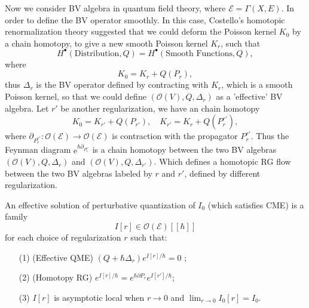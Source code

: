 \documentclass[10pt]{article}
\begin{document}
Now we consider BV algebra in quantum field theory, where $ \mathcal{E} = \Gamma(X,E)$.
In order to define the BV operator smoothly. In this case, Costello's homotopic renormalization theory suggested that we could deform the Poisson kernel $ K_0$ by a chain homotopy, to give a new smooth Poisson kernel $ K_r$, such that
\begin{equation*}
  H^{\bullet}(\text{Distribution}, Q) = H^{\bullet}(\text{Smooth Functions}, Q),
\end{equation*}
where
\begin{equation*}
  K_0 = K_r + Q(P_r),
\end{equation*}
thus $ \Delta_{r}$ is the BV operator defined by contracting with $ K_r$, which is a smooth Poisson kernel, so that we could define $\left( \mathcal{O}(V), Q, \Delta_{r} \right)$ as a 'effective' BV algebra.
Let $ r'$ be another regularization, we have an chain homotopy
\begin{equation*}
  K_0 = K_{r'} + Q(P_{r'}), \quad K_{r'} = K_{r} + Q(P_r^{r'}),
\end{equation*}
where $\partial_{P_{r}^{r'}}: \mathcal{O}(\mathcal{E}) \rightarrow \mathcal{O}(\mathcal{E})$ is contraction with the propagator $ P_{r}^{r'}$.
Thus the Feynman diagram $ \mathrm{e}^{\hbar \partial_{P_{r}^{r'}}}$ is a chain homotopy between the two BV algebras $\left( \mathcal{O}(V), Q, \Delta_{r} \right)$ and $\left( \mathcal{O}(V), Q, \Delta_{r'} \right)$.
Which defines a homotopic RG flow between the two BV algebras labeled by $ r$ and $ r'$, defined by different regularization.
\begin{definition}
  An effective solution of perturbative quantization of $I_0$ (which satisfies CME) is a family
  \begin{equation*}
    I[r] \in \mathcal{O}(\mathcal{E})[[\hbar]]
  \end{equation*}
  for each choice of regularization $r$ such that:
  \begin{itemize}
    \item[(1)] (Effective QME) $(Q + \hbar\Delta_r) e^{I[r]/\hbar} = 0$ ;
    \item[(2)] (Homotopy RG) $e^{I[r]/\hbar} = e^{\hbar \partial P_r} e^{I[r']/\hbar}$;
    \item[(3)] $I[r]$ is asymptotic local when $r \to 0$ and $ \lim_{r \to 0} I_0[r] = I_0. $
  \end{itemize}
\end{definition}

\label{LastPage}
\end{document}
